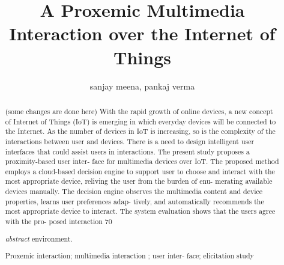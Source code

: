 \documentclass[runningheads,a4paper]{llncs}
\newcommand{\keywords}[1]{\par\addvspace\baselineskip
\noindent\keywordname\enspace\ignorespaces#1}
\begin{document}
\mainmatter  %

\title{A Proxemic Multimedia Interaction over the Internet of Things}


%
%
\author{sanjay meena, pankaj verma }






%
%

\maketitle


\begin{abstract}
(some changes are done here)
With the rapid growth of online devices, a new concept of Internet of Things (IoT) is emerging in which everyday devices will be connected to the Internet. As the number of devices in IoT is increasing, so is the complexity of the interactions between user and devices. There is a need to design intelligent user interfaces that could assist users in interactions. The present study proposes a proximity-based user inter- face for multimedia devices over IoT. The proposed method employs a cloud-based decision engine to support user to choose and interact with the most appropriate device, reliving the user from the burden of enu- merating available devices manually. The decision engine observes the multimedia content and device properties, learns user preferences adap- tively, and automatically recommends the most appropriate device to interact. The system evaluation shows that the users agree with the pro- posed interaction 70%

\emph{abstract} environment.
\keywords{Proxemic interaction; multimedia interaction ; user inter- face; elicitation study 
}
\end{abstract}
\end{document}
